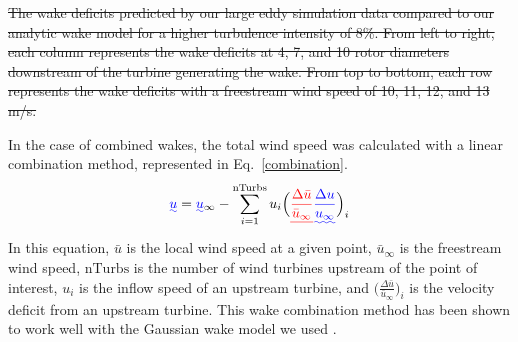\documentclass[11pt,letterpaper]{article}
\providecommand{\DIFadd}[1]{{\protect\color{blue}\uwave{#1}}} %
\providecommand{\DIFdel}[1]{{\protect\color{red}\sout{#1}}}                      %
\providecommand{\DIFaddbegin}{} %
\providecommand{\DIFaddend}{} %
\providecommand{\DIFdelbegin}{} %
\providecommand{\DIFdelend}{} %
\providecommand{\DIFdelFL}[1]{\DIFdel{#1}} %
\newcommand{\DIFscaledelfig}{0.5}
\newlength{\DIFdelgraphicswidth} %
\newlength{\DIFdelgraphicsheight} %
\newcommand{\DIFaddincludegraphics}[2][]{{\color{blue}\fbox{\DIFOincludegraphics[#1]{#2}}}} %
\newcommand{\DIFdelincludegraphics}[2][]{%
\sbox{\DIFdelgraphicsbox}{\DIFOincludegraphics[#1]{#2}}%
\settoboxwidth{\DIFdelgraphicswidth}{\DIFdelgraphicsbox} %
\settoboxtotalheight{\DIFdelgraphicsheight}{\DIFdelgraphicsbox} %
\scalebox{\DIFscaledelfig}{%
\parbox[b]{\DIFdelgraphicswidth}{\usebox{\DIFdelgraphicsbox}\\[-\baselineskip] \rule{\DIFdelgraphicswidth}{0em}}\llap{\resizebox{\DIFdelgraphicswidth}{\DIFdelgraphicsheight}{%
\setlength{\unitlength}{\DIFdelgraphicswidth}%
\begin{picture}(1,1)%
\thicklines\linethickness{2pt} %
{\color[rgb]{1,0,0}\put(0,0){\framebox(1,1){}}}%
{\color[rgb]{1,0,0}\put(0,0){\line( 1,1){1}}}%
{\color[rgb]{1,0,0}\put(0,1){\line(1,-1){1}}}%
\end{picture}%
}\hspace*{3pt}}} %
} %
\DeclareRobustCommand{\DIFaddbegin}{\DIFOaddbegin \let\includegraphics\DIFaddincludegraphics} %
\DeclareRobustCommand{\DIFaddend}{\DIFOaddend \let\includegraphics\DIFOincludegraphics} %
\DeclareRobustCommand{\DIFdelbegin}{\DIFOdelbegin \let\includegraphics\DIFdelincludegraphics} %
\DeclareRobustCommand{\DIFdelend}{\DIFOaddend \let\includegraphics\DIFOincludegraphics} %
\begin{document}
\DIFdelbegin %
{%
\DIFdelFL{The wake deficits predicted by our large eddy simulation data compared to our analytic wake model for a higher turbulence intensity of 8\%. From left to right, each column represents the wake deficits at 4, 7, and 10 rotor diameters downstream of the turbine generating the wake. From top to bottom, each row represents the wake deficits with a freestream wind speed of 10, 11, 12, and 13 m/s.}}
\DIFdelend 

In the case of combined wakes, the total wind speed was calculated with a linear combination method, represented in Eq.~\ref{combination}.
%
\begin{equation}
    \label{combination}
    \DIFdelbegin %
\DIFdelend \DIFaddbegin \DIFadd{u }\DIFaddend = \DIFdelbegin %
\DIFdelend \DIFaddbegin \DIFadd{u}\DIFaddend _\infty - \sum_{i=1}^\text{nTurbs} u_i \Big(\DIFdelbegin \DIFdel{\frac{\Delta\bar{u}}{\bar{u}_{\infty}}}\DIFdelend \DIFaddbegin \DIFadd{\frac{\Delta u}{u_{\infty}}}\DIFaddend \Big)_i
\end{equation}
% 
In this equation, \DIFdelbegin \DIFdel{$\bar{u}$ }\DIFdelend \DIFaddbegin \DIFadd{$u$ }\DIFaddend is the local wind speed at a given point, \DIFdelbegin \DIFdel{$\bar{u}_\infty$ }\DIFdelend \DIFaddbegin \DIFadd{$u_\infty$ }\DIFaddend is the freestream wind speed, $\text{nTurbs}$ is the number of wind turbines upstream of the point of interest, $u_i$ is the inflow speed of an upstream turbine, and \DIFdelbegin \DIFdel{$\Big(\frac{\Delta\bar{u}}{\bar{u}_{\infty}}\Big)_i$ }\DIFdelend \DIFaddbegin \DIFadd{$\Big(\frac{\Delta u}{u_{\infty}}\Big)_i$ }\DIFaddend is the velocity deficit from an upstream turbine. This wake combination method has been shown to work well with the Gaussian wake model we used \cite{niayifar2016analytical}.
\end{document}
